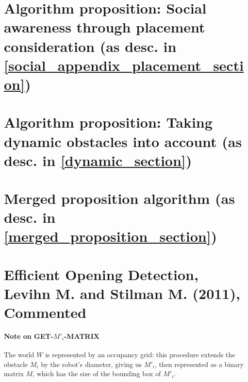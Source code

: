 \section{Algorithm proposition: Social awareness through placement consideration (as desc. in \ref{social_appendix_placement_section})}\label{appendix_placement_section}




\section{Algorithm proposition: Taking dynamic obstacles into account (as desc. in \ref{dynamic_section})}\label{appendix_dynamic_section}



\section{Merged proposition algorithm (as desc. in \ref{merged_proposition_section})}\label{appendix_merged_proposition_section}





\clearpage

\section{Efficient Opening Detection, Levihn M. and Stilman M. (2011), Commented}\label{appendix_eod_section}

\paragraph{Note on GET-$M'_{i}$-MATRIX}\label{get_mi_matrix_note} The world $W$ is represented by an occupancy grid: this procedure extends the obstacle $M_{i}$ by the robot's diameter, giving us $M'_{i}$, then represented as a binary matrix $M$, which has the size of the bounding box of $M'_{i}$.


